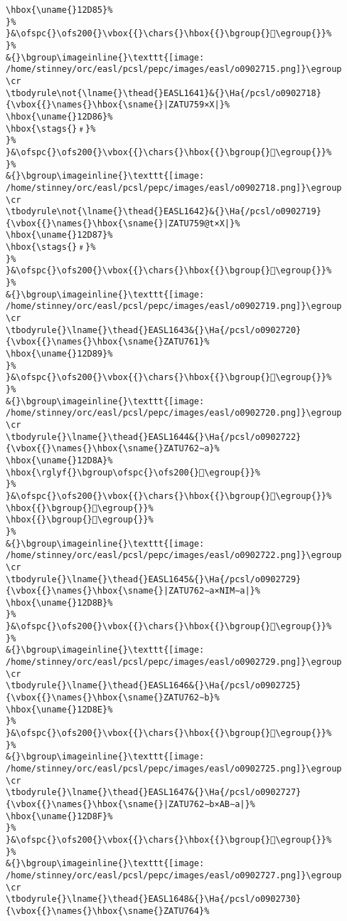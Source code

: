 \begin{verbatim}
\hbox{\uname{}12D85}%
}%
}&\ofspc{}\ofs200{}\vbox{{}\chars{}\hbox{{}\bgroup{}𒶅\egroup{}}%
}%
&{}\bgroup\imageinline{}\texttt{[image: /home/stinney/orc/easl/pcsl/pepc/images/easl/o0902715.png]}\egroup
\cr
\tbodyrule\not{\lname{}\thead{}EASL1641}&{}\Ha{/pcsl/o0902718}{\vbox{{}\names{}\hbox{\sname{}|ZATU759×X|}%
\hbox{\uname{}12D86}%
\hbox{\stags{}﹟}%
}%
}&\ofspc{}\ofs200{}\vbox{{}\chars{}\hbox{{}\bgroup{}𒶆\egroup{}}%
}%
&{}\bgroup\imageinline{}\texttt{[image: /home/stinney/orc/easl/pcsl/pepc/images/easl/o0902718.png]}\egroup
\cr
\tbodyrule\not{\lname{}\thead{}EASL1642}&{}\Ha{/pcsl/o0902719}{\vbox{{}\names{}\hbox{\sname{}|ZATU759@t×X|}%
\hbox{\uname{}12D87}%
\hbox{\stags{}﹟}%
}%
}&\ofspc{}\ofs200{}\vbox{{}\chars{}\hbox{{}\bgroup{}𒶇\egroup{}}%
}%
&{}\bgroup\imageinline{}\texttt{[image: /home/stinney/orc/easl/pcsl/pepc/images/easl/o0902719.png]}\egroup
\cr
\tbodyrule{}\lname{}\thead{}EASL1643&{}\Ha{/pcsl/o0902720}{\vbox{{}\names{}\hbox{\sname{}ZATU761}%
\hbox{\uname{}12D89}%
}%
}&\ofspc{}\ofs200{}\vbox{{}\chars{}\hbox{{}\bgroup{}𒶉\egroup{}}%
}%
&{}\bgroup\imageinline{}\texttt{[image: /home/stinney/orc/easl/pcsl/pepc/images/easl/o0902720.png]}\egroup
\cr
\tbodyrule{}\lname{}\thead{}EASL1644&{}\Ha{/pcsl/o0902722}{\vbox{{}\names{}\hbox{\sname{}ZATU762∼a}%
\hbox{\uname{}12D8A}%
\hbox{\rglyf{}\bgroup\ofspc{}\ofs200{}𒶊\egroup{}}%
}%
}&\ofspc{}\ofs200{}\vbox{{}\chars{}\hbox{{}\bgroup{}𒶍\egroup{}}%
\hbox{{}\bgroup{}𒶌\egroup{}}%
\hbox{{}\bgroup{}𒶊\egroup{}}%
}%
&{}\bgroup\imageinline{}\texttt{[image: /home/stinney/orc/easl/pcsl/pepc/images/easl/o0902722.png]}\egroup
\cr
\tbodyrule{}\lname{}\thead{}EASL1645&{}\Ha{/pcsl/o0902729}{\vbox{{}\names{}\hbox{\sname{}|ZATU762∼a×NIM∼a|}%
\hbox{\uname{}12D8B}%
}%
}&\ofspc{}\ofs200{}\vbox{{}\chars{}\hbox{{}\bgroup{}𒶋\egroup{}}%
}%
&{}\bgroup\imageinline{}\texttt{[image: /home/stinney/orc/easl/pcsl/pepc/images/easl/o0902729.png]}\egroup
\cr
\tbodyrule{}\lname{}\thead{}EASL1646&{}\Ha{/pcsl/o0902725}{\vbox{{}\names{}\hbox{\sname{}ZATU762∼b}%
\hbox{\uname{}12D8E}%
}%
}&\ofspc{}\ofs200{}\vbox{{}\chars{}\hbox{{}\bgroup{}𒶎\egroup{}}%
}%
&{}\bgroup\imageinline{}\texttt{[image: /home/stinney/orc/easl/pcsl/pepc/images/easl/o0902725.png]}\egroup
\cr
\tbodyrule{}\lname{}\thead{}EASL1647&{}\Ha{/pcsl/o0902727}{\vbox{{}\names{}\hbox{\sname{}|ZATU762∼b×AB∼a|}%
\hbox{\uname{}12D8F}%
}%
}&\ofspc{}\ofs200{}\vbox{{}\chars{}\hbox{{}\bgroup{}𒶏\egroup{}}%
}%
&{}\bgroup\imageinline{}\texttt{[image: /home/stinney/orc/easl/pcsl/pepc/images/easl/o0902727.png]}\egroup
\cr
\tbodyrule{}\lname{}\thead{}EASL1648&{}\Ha{/pcsl/o0902730}{\vbox{{}\names{}\hbox{\sname{}ZATU764}%

\end{verbatim}
